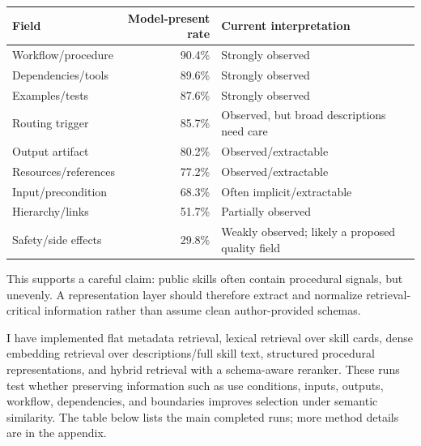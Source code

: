 \documentclass[10pt,a4paper]{article}
\newcommand{\sectiontitle}[1]{\vspace{0.22em}{\normalsize\bfseries\color{headingblue} #1}\par\vspace{-0.35em}}
\begin{document}
\begin{center}
\scriptsize
\begin{tabular}{@{}lrl@{}}
\toprule
\textbf{Field} & \textbf{Model-present rate} & \textbf{Current interpretation} \\
\midrule
Workflow/procedure & 90.4\% & Strongly observed \\
Dependencies/tools & 89.6\% & Strongly observed \\
Examples/tests & 87.6\% & Strongly observed \\
Routing trigger & 85.7\% & Observed, but broad descriptions need care \\
Output artifact & 80.2\% & Observed/extractable \\
Resources/references & 77.2\% & Observed/extractable \\
Input/precondition & 68.3\% & Often implicit/extractable \\
Hierarchy/links & 51.7\% & Partially observed \\
Safety/side effects & 29.8\% & Weakly observed; likely a proposed quality field \\
\bottomrule
\end{tabular}
\end{center}

This supports a careful claim: public skills often contain procedural signals, but unevenly. A representation layer should therefore extract and normalize retrieval-critical information rather than assume clean author-provided schemas.

\sectiontitle{Retrieval Results So Far}

I have implemented flat metadata retrieval, lexical retrieval over skill cards, dense embedding retrieval over descriptions/full skill text, structured procedural representations, and hybrid retrieval with a schema-aware reranker. These runs test whether preserving information such as use conditions, inputs, outputs, workflow, dependencies, and boundaries improves selection under semantic similarity. The table below lists the main completed runs; more method details are in the appendix.
\end{document}
